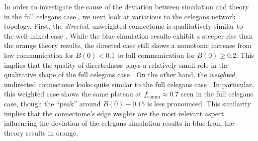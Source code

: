 \documentclass[pdflatex,lineno,referee,sn-mathphys-ay]{sn-jnl}
\begin{document}
In order to investigate the cause of the deviation
between simulation and theory
in the full \gls{celegans} case ,
we next look at variations to the \gls{celegans} network topology.
First, the \emph{directed}, unweighted connectome
is qualitatively similar to the well-mixed case
.
While the blue simulation results exhibit a steeper rise
than the orange theory results,
the directed case still shows a monotonic increase
from low communication for $B(0) < 0.1$
to full communication for $B(0) \ge 0.2$.
This implies that the quality of directedness
plays a relatively small role in the qualitative shape
of the full \gls{celegans} case .
On the other hand,
the \emph{weighted}, undirected connectome
looks quite similar to the full \gls{celegans} case
.
In particular, this weighted case
shows the same plateau at $f_{\text{comm}} \approx 0.7$
seen in the full \gls{celegans} case,
though the ``peak'' around $B(0) - 0.15$ is less pronounced.
This similarity implies that the connectome's edge weights
are the most relevant aspect influencing the deviation
of the \gls{celegans} 
simulation results in blue from the theory results in orange.
\end{document}
